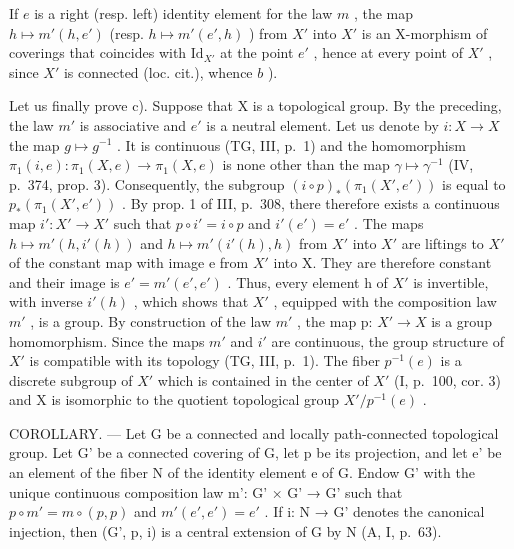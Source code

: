 If \(e\) is a right (resp. left) identity element for the law \(m\) , the map \(h \mapsto m'(h, e')\) (resp. \(h \mapsto m'(e', h)\) ) from \(X'\) into \(X'\) is an X-morphism of coverings that coincides with \(\text{Id}_{X'}\) at the point \(e'\) , hence at every point of \(X'\) , since \(X'\) is connected (loc. cit.), whence \(b\) ).

Let us finally prove c). Suppose that X is a topological group. By the preceding, the law \(m'\) is associative and \(e'\) is a neutral element. Let us denote by \(i: X \to X\) the map \(g \mapsto g^{-1}\) . It is continuous (TG, III, p.~1) and the homomorphism \(\pi_{1}(i,e): \pi_{1}(X,e) \to \pi_{1}(X,e)\) is none other than the map \(\gamma \mapsto \gamma^{-1}\) (IV, p.~374, prop. 3). Consequently, the subgroup \((i \circ p)_{*}(\pi_{1}(X',e'))\) is equal to \(p_{*}(\pi_{1}(X',e'))\) . By prop. 1 of III, p.~308, there therefore exists a continuous map \(i': X' \to X'\) such that \(p \circ i' = i \circ p\) and \(i'(e') = e'\) . The maps \(h \mapsto m'(h,i'(h))\) and \(h \mapsto m'(i'(h),h)\) from \(X'\) into \(X'\) are liftings to \(X'\) of the constant map with image e from \(X'\) into X. They are therefore constant and their image is \(e' = m'(e',e')\) . Thus, every element h of \(X'\) is invertible, with inverse \(i'(h)\) , which shows that \(X'\) , equipped with the composition law \(m'\) , is a group. By construction of the law \(m'\) , the map p: \(X' \to X\) is a group homomorphism. Since the maps \(m'\) and \(i'\) are continuous, the group structure of \(X'\) is compatible with its topology (TG, III, p.~1). The fiber \(p^{-1}(e)\) is a discrete subgroup of \(X'\) which is contained in the center of \(X'\) (I, p.~100, cor. 3) and X is isomorphic to the quotient topological group \(X'/p^{-1}(e)\) .

COROLLARY. --- Let G be a connected and locally path-connected topological group. Let G' be a connected covering of G, let p be its projection, and let e' be an element of the fiber N of the identity element e of G. Endow G' with the unique continuous composition law m': G' × G' → G' such that \(p \circ m' = m \circ (p, p)\) and \(m'(e', e') = e'\) . If i: N → G' denotes the canonical injection, then (G', p, i) is a central extension of G by N (A, I, p.~63).

